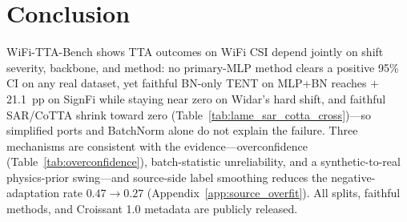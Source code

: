 \section{Conclusion}

WiFi-TTA-Bench shows TTA outcomes on WiFi CSI depend jointly on shift severity, backbone, and method: no primary-MLP method clears a positive 95\% CI on any real dataset, yet faithful BN-only TENT on MLP+BN reaches $+$21.1~pp on SignFi while staying near zero on Widar's hard shift, and faithful SAR/CoTTA shrink toward zero (Table~\ref{tab:lame_sar_cotta_cross})---so simplified ports and BatchNorm alone do not explain the failure. Three mechanisms are consistent with the evidence---overconfidence (Table~\ref{tab:overconfidence}), batch-statistic unreliability, and a synthetic-to-real physics-prior swing---and source-side label smoothing reduces the negative-adaptation rate $0.47\!\to\!0.27$ (Appendix~\ref{app:source_overfit}). All splits, faithful methods, and Croissant 1.0 metadata are publicly released.
